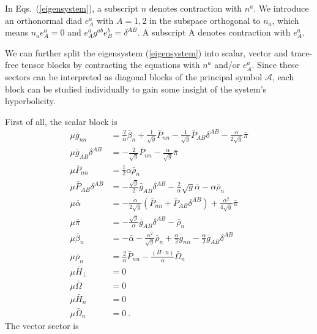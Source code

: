In Eqs.~(\ref{eigensystem}), a subscript $n$ denotes contraction with $n^{a}$. We introduce an orthonormal diad $e^{a}_{A}$ with $A = 1, 2$ in the subspace orthogonal to $n_{a}$, which means $n_{a}e^{a}_{A} = 0$ and $e^{a}_{A}g^{ab}e^{b}_{B} = \delta^{AB}$. A subscript A denotes contraction with $e^{a}_{A}$.

We can further split the eigensystem (\ref{eigensystem}) into scalar, vector and trace-free tensor blocks by contracting the equations with $n^{a}$ and/or $e^{a}_{A}$. Since these sectors can be interpreted as diagonal blocks of the principal symbol $\mathcal{A}$, each block can be studied individually to gain some insight of the system's hyperbolicity. 

First of all, the scalar block is
\begin{subequations}
\begin{align}
\mu {\bar g}_{nn} & = \frac{2}{\alpha}{\bar \beta}_{n} + \frac{1}{\sqrt{g}}{\bar P}_{nn} - \frac{1}{\sqrt{g}}{\bar P}_{AB}\delta^{AB} - \frac{\alpha}{2\sqrt{g}}{\bar \pi}\\
\mu {\bar g}_{AB}\delta^{AB} & = - \frac{2}{\sqrt{g}}{\bar P}_{nn} - \frac{\alpha}{\sqrt{g}}{\bar \pi}\\
\mu {\bar P}_{nn} & = \frac{1}{2}\alpha{\bar \rho}_{n}\\
\mu {\bar P}_{AB}\delta^{AB} & = -\frac{\sqrt{g}}{2}{\bar g}_{AB}\delta^{AB} - \frac{2}{\alpha}\sqrt{g} {\bar \alpha} - \alpha {\bar \rho}_{n}\\
\mu {\bar \alpha} & = - \frac{\alpha}{2\sqrt{g}}\left({\bar P}_{nn} + {\bar P}_{AB}\delta^{AB}\right) + \frac{\alpha^{2}}{4\sqrt{g}}{\bar \pi}\\
\mu {\bar \pi} & = -\frac{\sqrt{g}}{\alpha}{\bar g}_{AB}\delta^{AB} - {\bar \rho}_{n}\\
\mu {\bar \beta}_{n} & = - {\bar \alpha} - \frac{\alpha^{2}}{\sqrt{g}}{\bar \rho}_{n} + \frac{\alpha}{2}{\bar g}_{nn} - \frac{\alpha}{2}{\bar g}_{AB}\delta^{AB}\\
\mu {\bar \rho}_{n} & = \frac{2}{\alpha}{\bar P}_{nn} -  \frac{\left(H \cdot n \right)}{\alpha}{\bar \Omega}_{n}\\
\mu {\bar H}_{\perp} & = 0\\
\mu {\bar \Omega} & = 0\\
\mu {\bar H}_{n} & = 0\\
\mu {\bar \Omega}_{n} & = 0 \ .
\end{align}
\end{subequations}
The vector sector is
